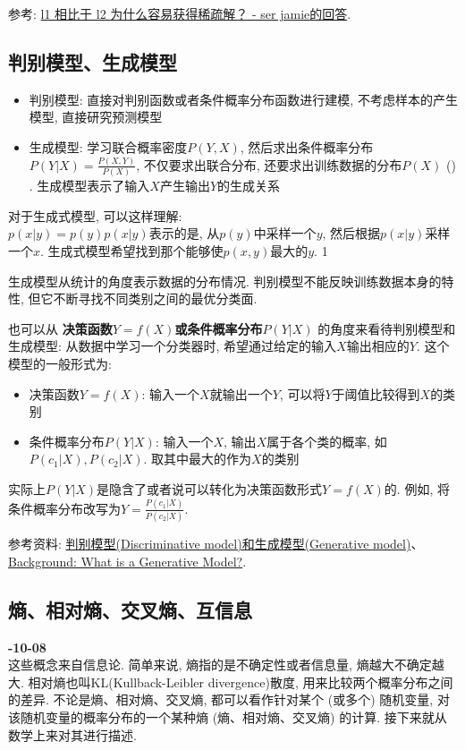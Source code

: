 \begin{flushright}
	
\end{flushright}参考: \href{https://www.zhihu.com/question/37096933/answer/475278057}{l1 相比于 l2 为什么容易获得稀疏解？ - ser jamie的回答}. 


\subsection{判别模型、生成模型}
\begin{itemize}
	\item 判别模型: 直接对判别函数或者条件概率分布函数进行建模, 不考虑样本的产生模型, 直接研究预测模型
	\item 生成模型: 学习联合概率密度$P(Y, X)$, 然后求出条件概率分布$P(Y|X) = \frac{P(X, Y)}{P(X)}$, 不仅要求出联合分布, 还要求出训练数据的分布$P(X)$ ({\color{red}{不一定要计算$p(X)$, 因为对于同一个样本, 计算它属于不同分类时, 其$p(X)$是一样的, 对判别没有帮助}}) . 生成模型表示了输入$X$产生输出$Y$的生成关系
\end{itemize}

对于生成式模型, 可以这样理解: \\
$p(x | y) = p(y)p(x | y)$表示的是, 从$p(y)$中采样一个$y$, 然后根据$p(x|y)$采样一个$x$. 生成式模型希望找到那个能够使$p(x, y)$最大的$y$. 1


生成模型从统计的角度表示数据的分布情况. 判别模型不能反映训练数据本身的特性, 但它不断寻找不同类别之间的最优分类面. 

也可以从 \textbf{决策函数$Y=f(X)$或条件概率分布$P(Y|X)$} 的角度来看待判别模型和生成模型: 
从数据中学习一个分类器时, 希望通过给定的输入$X$输出相应的$Y$. 这个模型的一般形式为: 
\begin{itemize}
	\item 决策函数$Y=f(X)$: 输入一个$X$就输出一个$Y$, 可以将$Y$于阈值比较得到$X$的类别
	\item 条件概率分布$P(Y|X)$: 输入一个$X$, 输出$X$属于各个类的概率, 如$P(c_1 | X), P(c_2 | X)$. 取其中最大的作为$X$的类别
\end{itemize}
实际上$P(Y|X)$是隐含了或者说可以转化为决策函数形式$Y=f(X)$的. 例如, 将条件概率分布改写为$Y = \frac{P(c_1 | X)}{P(c_2 | X) }$. 

参考资料: \href{https://blog.csdn.net/fishmemory/article/details/51711114}{判别模型(Discriminative model)和生成模型(Generative model)}、\href{https://developers.google.cn/machine-learning/gan/generative?hl=zh-cn}{Background: What is a Generative Model?}. 

\subsection{熵、相对熵、交叉熵、互信息} 
\textbf{-10-08}\\
这些概念来自信息论\cite{6773024}. 简单来说, 熵指的是不确定性或者信息量, 熵越大不确定越大. 相对熵也叫KL(Kullback-Leibler divergence)散度, 用来比较两个概率分布之间的差异. 不论是熵、相对熵、交叉熵, 都可以看作针对某个 (或多个) 随机变量, 对该随机变量的概率分布的一个某种熵 (熵、相对熵、交叉熵) 的计算. 接下来就从数学上来对其进行描述. 

